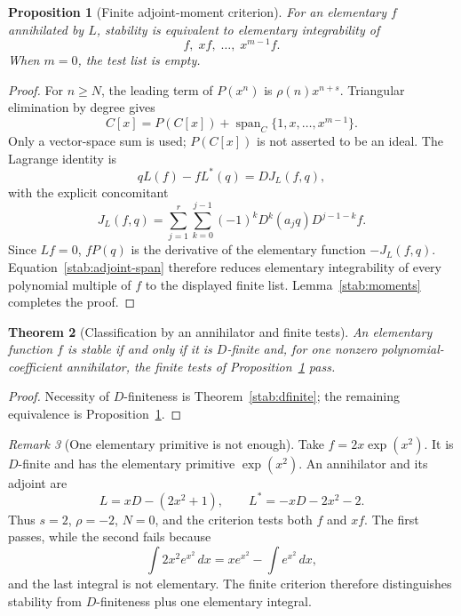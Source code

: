 \documentclass[11pt,a4paper]{article}
\newtheorem{theorem}{Theorem}[section]
\newtheorem{proposition}[theorem]{Proposition}
\theoremstyle{definition}
\theoremstyle{remark}
\newtheorem{remark}[theorem]{Remark}
\numberwithin{equation}{section}
\begin{document}
\begin{proposition}[Finite adjoint-moment criterion]\label{stab:adjoint}
For an elementary $f$ annihilated by $L$, stability is equivalent to
elementary integrability of
\[
 f,\;xf,\;\ldots,\;x^{m-1}f.
\]
When $m=0$, the test list is empty.
\end{proposition}
\begin{proof}
For $n\geq N$, the leading term of $P(x^n)$ is
$\rho(n)x^{n+s}$.  Triangular elimination by degree gives
\begin{equation}\label{stab:adjoint-span}
 C[x]=P(C[x])+\operatorname{span}_C\{1,x,\ldots,x^{m-1}\}.
\end{equation}
Only a vector-space sum is used; $P(C[x])$ is not asserted to be an
ideal.  The Lagrange identity is
\[
 qL(f)-fL^*(q)=D J_L(f,q),
\]
with the explicit concomitant
\[
 J_L(f,q)=\sum_{j=1}^r\sum_{k=0}^{j-1}
       (-1)^kD^k(a_jq)D^{j-1-k}f.
\]
Since $Lf=0$, $fP(q)$ is the derivative of the elementary function
$-J_L(f,q)$.  Equation~\eqref{stab:adjoint-span} therefore reduces
elementary integrability of every polynomial multiple of $f$ to the
displayed finite list.  Lemma~\ref{stab:moments} completes the proof.
\end{proof}

\begin{theorem}[Classification by an annihilator and finite tests]
\label{stab:classification}
An elementary function $f$ is stable if and only if it is $D$-finite
and, for one nonzero polynomial-coefficient annihilator, the finite
tests of Proposition~\ref{stab:adjoint} pass.
\end{theorem}
\begin{proof}
Necessity of $D$-finiteness is Theorem~\ref{stab:dfinite}; the remaining
equivalence is Proposition~\ref{stab:adjoint}.
\end{proof}

\begin{remark}[One elementary primitive is not enough]\label{stab:example}
Take $f=2x\exp(x^2)$.  It is $D$-finite and has the elementary primitive
$\exp(x^2)$.  An annihilator and its adjoint are
\[
 L=xD-(2x^2+1),\qquad L^*=-xD-2x^2-2.
\]
Thus $s=2$, $\rho=-2$, $N=0$, and the criterion tests both $f$ and
$xf$.  The first passes, while the second fails because
\[
 \int 2x^2e^{x^2}\,dx=xe^{x^2}-\int e^{x^2}\,dx,
\]
and the last integral is not elementary.  The finite criterion therefore
distinguishes stability from $D$-finiteness plus one elementary integral.
\end{remark}
\end{document}
